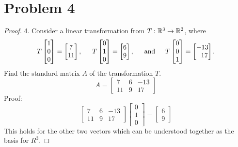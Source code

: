 \documentclass[12pt]{article}
\newcommand{\tab}{\\\\}
\newcommand{\sect}[1]{\section*{#1}}
\begin{document}
\sect{Problem 4}
\begin{proof}
  4. Consider a linear transformation from $T : {\Bbb R}^3 \rightarrow {\Bbb R}^2$, where
  \[
  T\begin{bmatrix} 1 \\ 0 \\ 0 \end{bmatrix} = \begin{bmatrix} 7 \\ 11 \end{bmatrix},\hskip 15pt T\begin{bmatrix} 0 \\ 1 \\ 0 \end{bmatrix} = \begin{bmatrix} 6 \\ 9 \end{bmatrix},\hskip 15pt \mbox{and} \hskip 15pt
  T\begin{bmatrix} 0 \\ 0 \\ 1 \end{bmatrix} = \begin{bmatrix} -13\\~~17\end{bmatrix}.
  \]
  Find the standard matrix $A$ of the transformation $T$.
  \[
    A=\begin{bmatrix}
      7&6&-13\\
      11&9&17
  \end{bmatrix}
  \]
  Proof:
  \[
  \begin{bmatrix}
    7&6&-13\\
    11&9&17
  \end{bmatrix}
  \begin{bmatrix}
  0\\1\\0
  \end{bmatrix}
  =\begin{bmatrix}
  6\\9
  \end{bmatrix}
  \]
  This holds for the other two vectors which can be understood together as the basis for $R^3$.
  \noindent
\end{proof}\tab\tab
\end{document}
